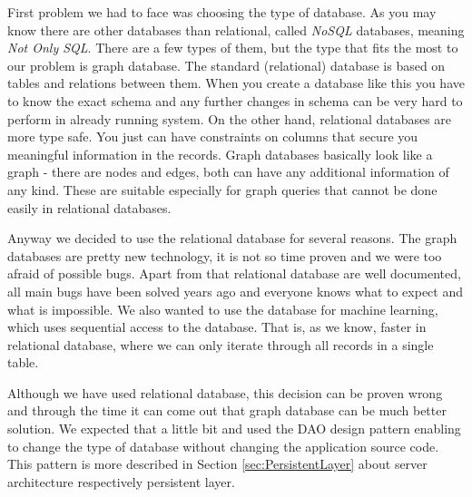 First problem we had to face was choosing the type of database. As you may know
there are other databases than relational, called \emph{NoSQL} databases,
meaning \emph{Not Only SQL}. There are a few types of them, but the type that
fits the most to our problem is graph database. The standard (relational)
database is based on tables and relations between them. When you create a
database like this you have to know the exact schema and any further changes in
schema can be very hard to perform in already running system. On the other hand,
relational databases are more type safe. You just can have constraints on
columns that secure you meaningful information in the records. Graph databases
basically look like a graph - there are nodes and edges, both can have any
additional information of any kind. These are suitable especially for graph
queries that cannot be done easily in relational databases.

Anyway we decided to use the relational database for several reasons.
The graph databases are pretty new technology, it is not so time proven and we
were too afraid of  possible bugs. Apart from that relational database are well
documented, all main bugs have been solved years ago and everyone knows what to
expect and what is impossible.
We also wanted to use the database for machine learning, which uses sequential
access to the database. That is, as we know, faster in relational database,
where we can only iterate through all records in a single table.

Although we have used relational database, this decision can be proven wrong and
through the time it can come out that graph database can be much better
solution. We expected that a little bit and used the DAO design pattern enabling
to change the type of database without changing the application source code.
This pattern is more described in Section \ref{sec:PersistentLayer} about server
architecture respectively persistent layer.
